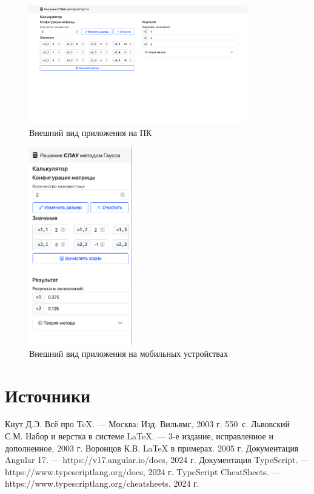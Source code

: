 \documentclass[12pt,a4paper]{scrartcl}
\begin{document}
\begin{figure}[H]
	\centering
	\includegraphics[width=0.85\textwidth]{./pictures/screenshot0.png}
	\caption{Внешний вид приложения на ПК}
	\label{fig:screenshot0}
\end{figure}

\begin{figure}[H]
	\centering
	\includegraphics[width=0.4\textwidth]{./pictures/screenshot1.png}
	\caption{Внешний вид приложения на мобильных устройствах}
	\label{fig:screenshot1}
\end{figure}

\section{Источники}
\begin{thebibliography}{9}
Кнут Д.Э. Всё про \TeX. \newblock --- Москва: Изд. Вильямс, 2003 г. 550~с.
Львовский С.М. Набор и верстка в системе \LaTeX{}. \newblock --- 3-е издание, исправленное и дополненное, 2003 г.
Воронцов К.В. \LaTeX{} в примерах. 2005 г.
Документация Angular 17. \newblock --- https://v17.angular.io/docs, 2024 г.
Документация TypeScript. \newblock --- https://www.typescriptlang.org/docs, 2024 г.
TypeScript CheatSheets. \newblock --- https://www.typescriptlang.org/cheatsheets, 2024 г.

\end{thebibliography}
\end{document}

